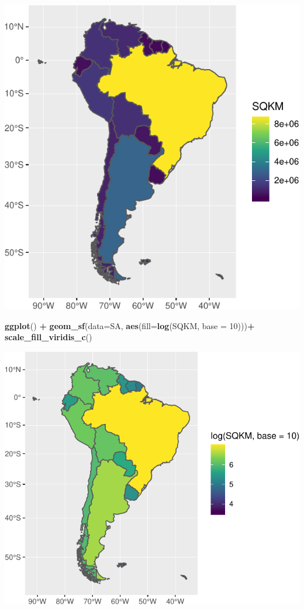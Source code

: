 \documentclass[]{article}
\newenvironment{Shaded}{\begin{snugshade}}{\end{snugshade}}
\newcommand{\DataTypeTok}[1]{\textcolor[rgb]{0.13,0.29,0.53}{#1}}
\newcommand{\DecValTok}[1]{\textcolor[rgb]{0.00,0.00,0.81}{#1}}
\newcommand{\KeywordTok}[1]{\textcolor[rgb]{0.13,0.29,0.53}{\textbf{#1}}}
\newcommand{\NormalTok}[1]{#1}
\newcommand{\OperatorTok}[1]{\textcolor[rgb]{0.81,0.36,0.00}{\textbf{#1}}}
\newcommand{\StringTok}[1]{\textcolor[rgb]{0.31,0.60,0.02}{#1}}
\begin{document}
\includegraphics{R_tidyverse_for_geographers_files/figure-latex/unnamed-chunk-33-3.pdf}

\begin{Shaded}
\begin{Highlighting}[]
\KeywordTok{ggplot}\NormalTok{() }\OperatorTok{+}\StringTok{ }\KeywordTok{geom_sf}\NormalTok{(}\DataTypeTok{data=}\NormalTok{SA, }\KeywordTok{aes}\NormalTok{(}\DataTypeTok{fill=}\KeywordTok{log}\NormalTok{(SQKM, }\DataTypeTok{base =} \DecValTok{10}\NormalTok{)))}\OperatorTok{+}
\StringTok{  }\KeywordTok{scale_fill_viridis_c}\NormalTok{()}
\end{Highlighting}
\end{Shaded}

\includegraphics{R_tidyverse_for_geographers_files/figure-latex/unnamed-chunk-33-4.pdf}
\end{document}
